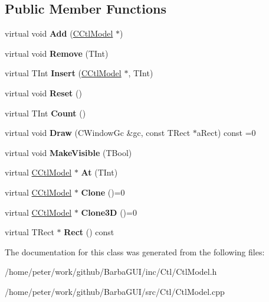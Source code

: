 \subsection*{Public Member Functions}
\begin{DoxyCompactItemize}
\item 
\mbox{\label{classCCtlModel_a965f60b58d4acf4255bac06ac25d59d3}} 
virtual void {\bfseries Add} (\hyperlink{classCCtlModel}{C\+Ctl\+Model} $\ast$)
\item 
\mbox{\label{classCCtlModel_aa441740adf43f79ec136d05c55267cd2}} 
virtual void {\bfseries Remove} (T\+Int)
\item 
\mbox{\label{classCCtlModel_affe0c82f78c498d112a815c20b54b79b}} 
virtual T\+Int {\bfseries Insert} (\hyperlink{classCCtlModel}{C\+Ctl\+Model} $\ast$, T\+Int)
\item 
\mbox{\label{classCCtlModel_a8af44b531571e4f9d70412725a4fb8fb}} 
virtual void {\bfseries Reset} ()
\item 
\mbox{\label{classCCtlModel_a45f15911ad8c5db7cf60ed852e0fbeaf}} 
virtual T\+Int {\bfseries Count} ()
\item 
\mbox{\label{classCCtlModel_a5665f9203ea46b7b25b04fd3389f8e27}} 
virtual void {\bfseries Draw} (C\+Window\+Gc \&gc, const T\+Rect $\ast$a\+Rect) const =0
\item 
\mbox{\label{classCCtlModel_a9b801547c8f133ee170d21d4f09f15e6}} 
virtual void {\bfseries Make\+Visible} (T\+Bool)
\item 
\mbox{\label{classCCtlModel_ab6b1f7605929dc98e2ea5f83d2e758cd}} 
virtual \hyperlink{classCCtlModel}{C\+Ctl\+Model} $\ast$ {\bfseries At} (T\+Int)
\item 
\mbox{\label{classCCtlModel_ab2540b346699910f76fe7b6b4d56a6d5}} 
virtual \hyperlink{classCCtlModel}{C\+Ctl\+Model} $\ast$ {\bfseries Clone} ()=0
\item 
\mbox{\label{classCCtlModel_aa59cde08577aaa22989e9e33a2328e20}} 
virtual \hyperlink{classCCtlModel}{C\+Ctl\+Model} $\ast$ {\bfseries Clone3D} ()=0
\item 
\mbox{\label{classCCtlModel_a5dc85500e7e5f5979873ce173ecf515a}} 
virtual T\+Rect $\ast$ {\bfseries Rect} () const
\end{DoxyCompactItemize}


The documentation for this class was generated from the following files\+:\begin{DoxyCompactItemize}
\item 
/home/peter/work/github/\+Barba\+G\+U\+I/inc/\+Ctl/Ctl\+Model.\+h\item 
/home/peter/work/github/\+Barba\+G\+U\+I/src/\+Ctl/Ctl\+Model.\+cpp\end{DoxyCompactItemize}
